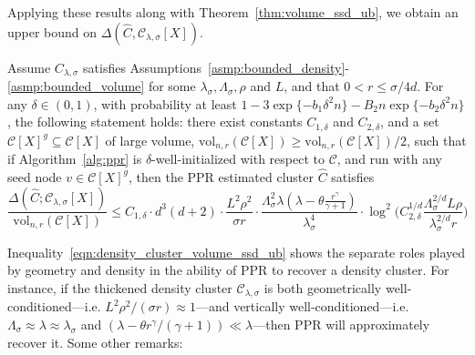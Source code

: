 \documentclass[11pt,twoside]{article}
\newcommand{\1}{\mathbf{1}}
\newcommand{\mc}[1]{\mathcal{#1}}
\newcommand{\wh}[1]{\widehat{#1}}
\newcommand{\vol}{\mathrm{vol}}
\begin{document}
\noindent Applying these results along with Theorem~\ref{thm:volume_ssd_ub}, we obtain an upper bound on $\Delta(\wh{C},\mc{C}_{\lambda,\sigma}[X])$.

\begin{corollary}
	\label{cor:density_cluster_volume_ssd_ub}
	Assume $C_{\lambda,\sigma}$ satisfies Assumptions~\ref{asmp:bounded_density}-\ref{asmp:bounded_volume} for some $\lambda_{\sigma}, \Lambda_{\sigma}, \rho$ and $L$, and that $0 < r \leq \sigma/4d$. For any $\delta \in (0,1)$, with probability at least $1 - 3\exp\{-b_1\delta^2 n\} - B_2n\exp\{-b_2\delta^2n\}$, the following statement holds: there exist constants $C_{1,\delta}$ and $C_{2,\delta}$, and a set $\mc{C}[X]^g \subseteq \mc{C}[X]$ of large volume, $\vol_{n,r}(\mc{C}[X]) \geq \vol_{n,r}(\mc{C}[X])/2$, such that if Algorithm~\ref{alg:ppr} is $\delta$-well-initialized with respect to $\mc{C}$, and run with any seed node $v \in \mc{C}[X]^g$, then the PPR estimated cluster $\wh{C}$ satisfies
	\begin{equation}
	\label{eqn:density_cluster_volume_ssd_ub}
	\frac{\Delta(\wh{C};\mc{C}_{\lambda,\sigma}[X])}{\vol_{n,r}(\mc{C}[X])} \leq C_{1,\delta} \cdot d^3(d + 2) \cdot \frac{L^2\rho^2}{\sigma r} \cdot \frac{\Lambda_{\sigma}^2 \lambda (\lambda - \theta \frac{r^{\gamma}}{\gamma + 1})}{\lambda_{\sigma}^4} \cdot \log^2\biggl(C_{2,\delta}^{1/d} \frac{\Lambda_{\sigma}^{2/d} L\rho}{\lambda_{\sigma}^{2/d}r}\biggr)
	\end{equation}
\end{corollary}
Inequality~\eqref{eqn:density_cluster_volume_ssd_ub} shows the separate roles played by geometry and density in the ability of PPR to recover a density cluster. For instance, if the thickened density cluster $\mc{C}_{\lambda,\sigma}$ is both geometrically well-conditioned---i.e. $L^2\rho^2/(\sigma r) \approx 1$---and vertically well-conditioned---i.e. $\Lambda_{\sigma} \approx \lambda \approx \lambda_{\sigma}$ and $(\lambda - \theta r^{\gamma}/(\gamma + 1)) \ll \lambda$---then PPR will approximately recover it.  Some other remarks:
\end{document}
